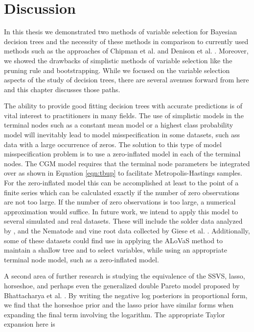 \section{Discussion}
\label{ch:discuss}
 
In this thesis we demonstrated two methods of variable selection for Bayesian decision trees and the necessity of these methods in comparison to currently used methods such as  the approaches of Chipman et al. \cite{chipman1998bayesian} and Denison et al. \cite{denison1998bayesian}. Moreover, we showed the drawbacks of simplistic methods of variable selection like the pruning rule and bootstrapping. While we focused on the variable selection aspects of the study of decision trees, there are several avenues forward from here and this chapter discusses those paths. 

The ability to provide good fitting decision trees with accurate predictions is of vital interest to practitioners in many fields. The use of simplistic models in the terminal nodes such as a constant mean model or a highest class probability model will inevitably lead to model misspecification in some datasets, such ass data with a large occurrence of zeros. The solution to this type of model misspecification problem is to use a zero-inflated model in each of the terminal nodes. The CGM model requires  that the terminal node parameters be integrated over as shown in Equation \ref{eqn:tbup} to facilitate Metropolis-Hastings samples. For the zero-inflated model this can be accomplished at least to the point of a finite series which can be calculated exactly if the number of zero observations are not too large. If the number of zero observations is too large, a numerical approximation would suffice. In future work, we intend to apply this model to several simulated and real datasets. These will include the solder data analyzed by \cite{lee2006decision}, and the Nematode and vine root data collected by Giese et al. \cite{}. Additionally, some of these datasets could find use in applying the ALoVaS method to maintain a shallow tree and to select variables, while using an appropriate terminal node model, such as a zero-inflated model.  

A second area of further research is studying the equivalence of the SSVS, lasso, horseshoe, and perhaps even the generalized double Pareto model proposed by Bhattacharya et al. \cite{bhattacharya2012bayesian}. By writing the negative log posteriors in proportional form, we find that the horseshoe prior and the lasso prior have similar forms when expanding the final term involving the logarithm. The appropriate Taylor expansion here is 

